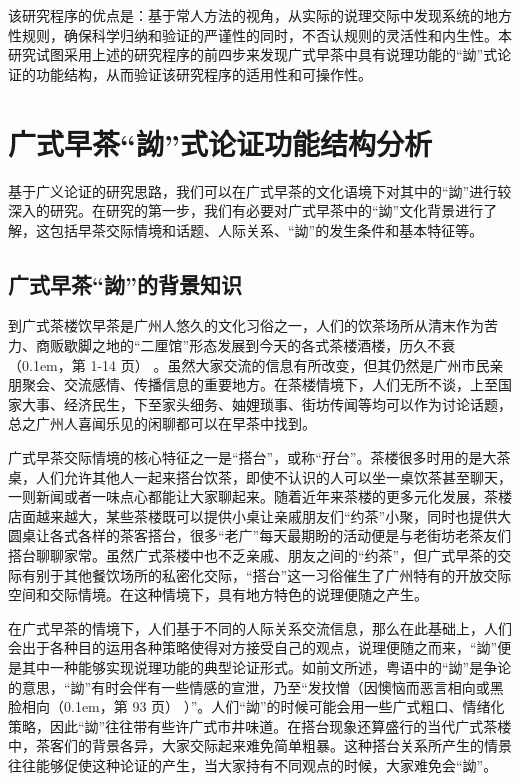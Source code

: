 \documentclass[b5paper,10.5pt,onecolumn,twoside,leqno,UTF8]{article}
\newcommand{\pcr}[1]{\raise0.1em\hbox{\parencite{#1}}}
\newcommand{\pc}[2]{（\pcr{#1}，第 #2 页）}
\begin{document}
该研究程序的优点是：基于常人方法的视角，从实际的说理交际中发现系统的地方性规则，确保科学归纳和验证的严谨性的同时，不否认规则的灵活性和内生性。本研究试图采用上述的研究程序的前四步来发现广式早茶中具有说理功能的“詏”式论证的功能结构，从而验证该研究程序的适用性和可操作性。

\section{广式早茶“詏”式论证功能结构分析}

基于广义论证的研究思路，我们可以在广式早茶的文化语境下对其中的“詏”进行较深入的研究。在研究的第一步，我们有必要对广式早茶中的“詏”文化背景进行了解，这包括早茶交际情境和话题、人际关系、“詏”的发生条件和基本特征等。

\subsection{广式早茶“詏”的背景知识}

到广式茶楼饮早茶是广州人悠久的文化习俗之一，人们的饮茶场所从清末作为苦力、商贩歇脚之地的“二厘馆”形态发展到今天的各式茶楼酒楼，历久不衰\pc{茉莉2009}{1-14} 。虽然大家交流的信息有所改变，但其仍然是广州市民亲朋聚会、交流感情、传播信息的重要地方。在茶楼情境下，人们无所不谈，上至国家大事、经济民生，下至家头细务、妯娌琐事、街坊传闻等均可以作为讨论话题，总之广州人喜闻乐见的闲聊都可以在早茶中找到。

广式早茶交际情境的核心特征之一是“搭台”，或称“孖台”。茶楼很多时用的是大茶桌，人们允许其他人一起来搭台饮茶，即使不认识的人可以坐一桌饮茶甚至聊天，一则新闻或者一味点心都能让大家聊起来。随着近年来茶楼的更多元化发展，茶楼店面越来越大，某些茶楼既可以提供小桌让亲戚朋友们“约茶”小聚，同时也提供大圆桌让各式各样的茶客搭台，很多“老广”每天最期盼的活动便是与老街坊老茶友们搭台聊聊家常。虽然广式茶楼中也不乏亲戚、朋友之间的“约茶”，但广式早茶的交际有别于其他餐饮场所的私密化交际，“搭台”这一习俗催生了广州特有的开放交际空间和交际情境。在这种情境下，具有地方特色的说理便随之产生。

在广式早茶的情境下，人们基于不同的人际关系交流信息，那么在此基础上，人们会出于各种目的运用各种策略使得对方接受自己的观点，说理便随之而来，“詏”便是其中一种能够实现说理功能的典型论证形式。如前文所述，粤语中的“詏”是争论的意思，“詏”有时会伴有一些情感的宣泄，乃至“发抆憎（因懊恼而恶言相向或黑脸相向\pc{张励妍 and 倪列怀1999}{93} ）”。人们“詏”的时候可能会用一些广式粗口、情绪化策略，因此“詏”往往带有些许广式市井味道。在搭台现象还算盛行的当代广式茶楼中，茶客们的背景各异，大家交际起来难免简单粗暴。这种搭台关系所产生的情景往往能够促使这种论证的产生，当大家持有不同观点的时候，大家难免会“詏”。
\end{document}
